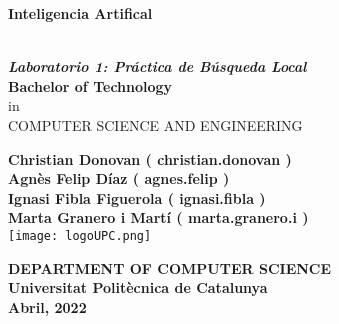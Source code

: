 \thispagestyle{empty}
\begin{center}
    \begin{LARGE}			\bf{Inteligencia Artifical\\}
    \end{LARGE}
    \vspace*{25pt}
    
    \textbf{\\
        \it{Laboratorio 1: Práctica de Búsqueda Local}\\}
        \vspace{20pt}
    \textbf{Bachelor of Technology\\}
    in\\
    \vspace{3pt}
    {COMPUTER SCIENCE AND ENGINEERING}\\
    \vspace{40pt}
    
    \textbf{
        Christian Donovan ( christian.donovan )\\
        Agnès Felip Díaz ( agnes.felip ) \\
        Ignasi Fibla Figuerola ( ignasi.fibla )\\
        Marta Granero i Martí ( marta.granero.i )}\\
    \vspace{30pt}
    \texttt{[image: logoUPC.png]} \\
    \vspace{160pt}
    
    \textbf{DEPARTMENT OF COMPUTER SCIENCE\\
        Universitat Politècnica de Catalunya\\
        Abril, 2022
    }
\end{center}